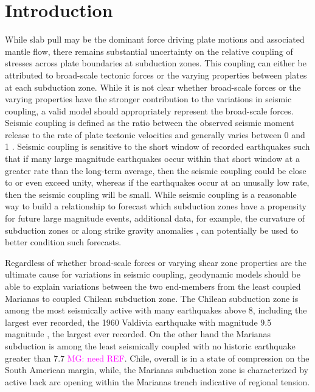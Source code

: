 \documentclass[12pt]{article}
\newcommand{\mgnote}[1]{\textcolor{magenta}{MG: #1}}
\begin{document}
\section{Introduction}
While slab pull may be the dominant force driving plate motions and associated mantle flow, there remains substantial uncertainty on the relative coupling of stresses across plate boundaries at subduction zones. This coupling can either be attributed to broad-scale tectonic forces or the varying properties between plates at each subduction zone. While it is not clear whether broad-scale forces or the varying properties have the stronger contribution to the variations in seismic coupling, a valid model should appropriately represent the broad-scale forces. 
Seismic coupling is defined as the ratio between the observed seismic moment release to the rate of plate tectonic velocities and generally varies between 0 and 1 \citep{davies1971regional}. 
Seismic coupling is sensitive to the short window of recorded earthquakes such that if many large magnitude earthquakes occur within that short window 
at a greater rate than the long-term average, then the seismic coupling could be close to or even exceed unity, whereas if the earthquakes occur at an unusally low rate, then the seismic coupling will be small.  While seismic coupling is a reasonable way to build a relationship to forecast which subduction zones have a propensity for future large magnitude events, additional data, for example, the curvature of subduction zones \citep{bletery2016mega} or along strike gravity anomalies \citep{song2003large}, 
can potentially be used to better condition such forecasts. 


Regardless of whether broad-scale forces or varying shear zone properties are the ultimate cause for variations in seismic coupling, geodynamic models should be able to explain variations between the two end-members from the least coupled Marianas to coupled Chilean subduction zone. The Chilean subduction zone is among the most seismically active with many earthquakes above 8, including the largest ever recorded, the 1960 Valdivia earthquake with magnitude 9.5 magnitude \citep{kanamori1974},
the largest ever recorded. On the other hand the Marianas subduction is among the least seismically coupled with no historic earthquake greater than 7.7 \mgnote{ need REF}. 
Chile, overall is in a state of compression on the South American margin, while, the Marianas subduction zone is characterized by active back arc opening within the Marianas trench indicative of regional tension.
\end{document}
